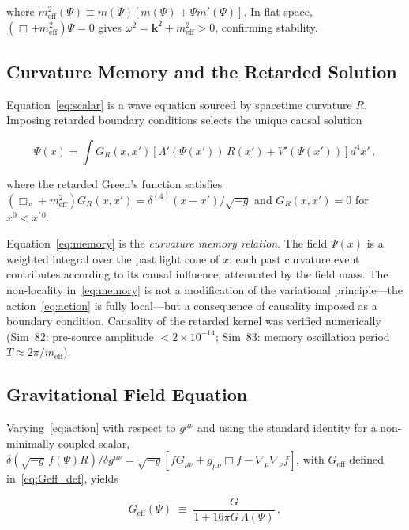 \documentclass[12pt,a4paper]{article}
\begin{document}
where $m_{\mathrm{eff}}^2(\Psi) \equiv m(\Psi)[m(\Psi) + \Psi m'(\Psi)]$.
In flat space, $(\Box + m_{\mathrm{eff}}^2)\Psi = 0$ gives
$\omega^2 = \mathbf{k}^2 + m_{\mathrm{eff}}^2 > 0$, confirming stability.

\subsection{Curvature Memory and the Retarded Solution}
\label{sec:memory}

Equation~\eqref{eq:scalar} is a wave equation sourced by spacetime curvature $R$.
Imposing retarded boundary conditions selects the unique causal solution

\begin{equation}
\label{eq:memory}
\boxed{
\Psi(x) = \int G_R(x,x')\left[
  \Lambda'(\Psi(x'))\,R(x') + V'(\Psi(x'))
\right]d^4x'\,,
}
\end{equation}

where the retarded Green's function satisfies
$(\Box_x + m_{\mathrm{eff}}^2)G_R(x,x') = \delta^{(4)}(x-x')/\sqrt{-g}$
and $G_R(x,x') = 0$ for $x^0 < x^{\prime\,0}$.

Equation~\eqref{eq:memory} is the \emph{curvature memory relation}. The field
$\Psi(x)$ is a weighted integral over the past light cone of $x$: each past
curvature event contributes according to its causal influence, attenuated by
the field mass. The non-locality in~\eqref{eq:memory} is not a modification of
the variational principle---the action~\eqref{eq:action} is fully local---but
a consequence of causality imposed as a boundary condition. Causality of the
retarded kernel was verified numerically (Sim~82: pre-source amplitude
$< 2\times 10^{-14}$; Sim~83: memory oscillation period $T \approx 2\pi/m_{\mathrm{eff}}$).

\subsection{Gravitational Field Equation}
\label{sec:grav_eq}

Varying~\eqref{eq:action} with respect to $g^{\mu\nu}$ and using the standard
identity for a non-minimally coupled scalar,
$\delta(\sqrt{-g}\,f(\Psi)R)/\delta g^{\mu\nu}
= \sqrt{-g}[fG_{\mu\nu} + g_{\mu\nu}\Box f - \nabla_\mu\nabla_\nu f]$,
with $G_{\mathrm{eff}}$ defined in~\eqref{eq:Geff_def}, yields

\begin{equation}
\label{eq:Geff_def}
G_{\mathrm{eff}}(\Psi) \;\equiv\; \frac{G}{1 + 16\pi G\,\Lambda(\Psi)}\,,
\end{equation}
\end{document}
